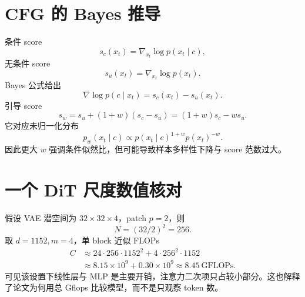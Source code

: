 \documentclass[UTF8,12pt,a4paper,fontset=none]{ctexart}
\numberwithin{equation}{section}
\begin{document}
\section{CFG 的 Bayes 推导}
条件 score
\begin{equation}
 s_c(x_t)=\nabla_{x_t}\log p(x_t\mid c),
\end{equation}
无条件 score
\begin{equation}
 s_u(x_t)=\nabla_{x_t}\log p(x_t).
\end{equation}
Bayes 公式给出
\begin{equation}
 \nabla\log p(c\mid x_t)
 =s_c(x_t)-s_u(x_t).
\end{equation}
引导 score
\begin{equation}
 s_w=s_u+(1+w)(s_c-s_u)
 =(1+w)s_c-ws_u.
\end{equation}
它对应未归一化分布
\begin{equation}
 p_w(x_t\mid c)\propto
 p(x_t\mid c)^{1+w}p(x_t)^{-w}.
\end{equation}
因此更大 $w$ 强调条件似然比，但可能导致样本多样性下降与 score 范数过大。

\section{一个 DiT 尺度数值核对}
假设 VAE 潜空间为 $32\times32\times4$，patch $p=2$，则
\begin{equation}
 N=(32/2)^2=256.
\end{equation}
取 $d=1152,m=4$，单 block 近似 FLOPs
\begin{align}
 C&\approx24\cdot256\cdot1152^2
 +4\cdot256^2\cdot1152\\
 &\approx8.15\times10^9+0.30\times10^9
 \approx8.45\ \mathrm{GFLOPs}.
\end{align}
可见该设置下线性层与 MLP 是主要开销，注意力二次项只占较小部分。这也解释了论文为何用总 Gflops 比较模型，而不是只观察 token 数。
\end{document}

